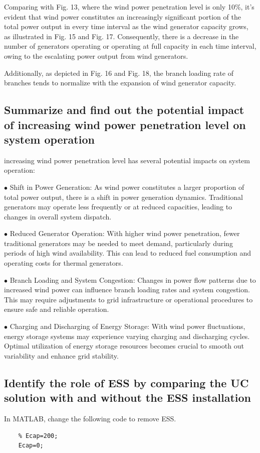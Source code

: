 \documentclass[lettersize,journal]{IEEEtran}
\begin{document}
Comparing with Fig. 13, where the wind power penetration level is only 10\%, it's evident that wind power constitutes an increasingly significant portion of the total power output in every time interval as the wind generator capacity grows, as illustrated in Fig. 15 and Fig. 17. Consequently, there is a decrease in the number of generators operating or operating at full capacity in each time interval, owing to the escalating power output from wind generators.

Additionally, as depicted in Fig. 16 and Fig. 18, the branch loading rate of branches tends to normalize with the expansion of wind generator capacity.

\subsection{Summarize and find out the potential impact of increasing wind power penetration level on system operation}

increasing wind power penetration level has several potential impacts on system operation:

$\bullet$ Shift in Power Generation: As wind power constitutes a larger proportion of total power output, there is a shift in power generation dynamics. Traditional generators may operate less frequently or at reduced capacities, leading to changes in overall system dispatch.

$\bullet$ Reduced Generator Operation: With higher wind power penetration, fewer traditional generators may be needed to meet demand, particularly during periods of high wind availability. This can lead to reduced fuel consumption and operating costs for thermal generators.

$\bullet$ Branch Loading and System Congestion: Changes in power flow patterns due to increased wind power can influence branch loading rates and system congestion. This may require adjustments to grid infrastructure or operational procedures to ensure safe and reliable operation.

$\bullet$ Charging and Discharging of Energy Storage: With wind power fluctuations, energy storage systems may experience varying charging and discharging cycles. Optimal utilization of energy storage resources becomes crucial to smooth out variability and enhance grid stability.

\subsection{Identify the role of ESS by comparing the UC solution with and without the ESS installation}
In MATLAB, change the following code to remove ESS.
\begin{lstlisting}
	% Ecap=200;  
	Ecap=0; 
\end{lstlisting}
\end{document}
